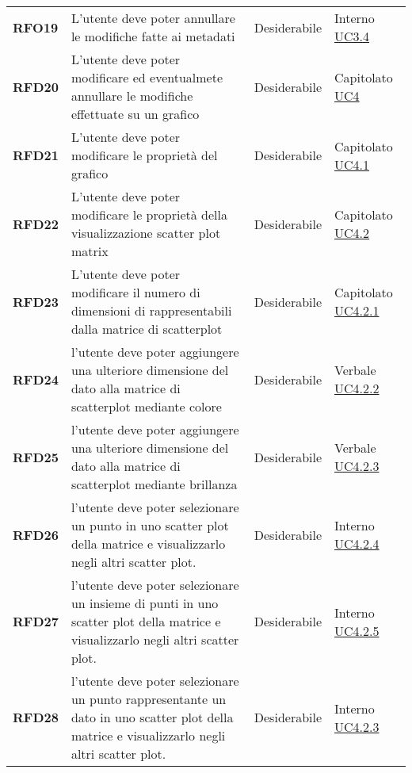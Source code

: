 \begin{longtable}[H]{>{\centering\bfseries}m{2cm} >{\centering}m{9cm} >{\centering}m{2.5cm} >{\centering\arraybackslash}m{2.5cm}}
    RFO19
    & L'utente deve poter annullare le modifiche fatte ai metadati
    & Desiderabile
    & Interno  \hyperref[ssub:uc3.4]{UC3.4} \\

    RFD20
    & L'utente deve poter modificare ed eventualmete annullare le modifiche effettuate su un grafico
    & Desiderabile
    & Capitolato \hyperref[ssub:uc4]{UC4} \\

    RFD21
    & L'utente deve poter modificare le proprietà del grafico
    & Desiderabile
    & Capitolato \hyperref[ssub:uc4.1]{UC4.1} \\

    RFD22
    & L'utente deve poter modificare le proprietà della visualizzazione scatter plot matrix
    & Desiderabile
    & Capitolato \hyperref[ssub:uc4.2]{UC4.2} \\

    RFD23
    & L'utente deve poter modificare il numero di dimensioni di rappresentabili dalla matrice di scatterplot
    & Desiderabile
    & Capitolato \hyperref[ssub:uc4.2.1]{UC4.2.1} \\

    RFD24
    & l'utente deve poter aggiungere una ulteriore dimensione del dato alla matrice di scatterplot mediante colore
    & Desiderabile
    & Verbale \hyperref[ssub:uc4.2.2]{UC4.2.2} \\

    RFD25
    & l'utente deve poter aggiungere una ulteriore dimensione del dato alla matrice di scatterplot mediante brillanza
    & Desiderabile
    & Verbale \hyperref[ssub:uc4.2.3]{UC4.2.3} \\

    RFD26
    & l'utente deve poter selezionare un punto in uno scatter plot della matrice e visualizzarlo negli altri scatter plot.
    & Desiderabile
    & Interno \hyperref[ssub:uc4.2.4]{UC4.2.4} \\

    RFD27
    & l'utente deve poter selezionare un insieme di punti in uno scatter plot della matrice e visualizzarlo negli altri scatter plot.
    & Desiderabile
    & Interno \hyperref[ssub:uc4.2.5]{UC4.2.5} \\

    RFD28
    & l'utente deve poter selezionare un punto rappresentante un dato in uno scatter plot della matrice e visualizzarlo negli altri scatter plot.
    & Desiderabile
    & Interno \hyperref[ssub:uc4.2.3]{UC4.2.3} \\


\end{longtable}
